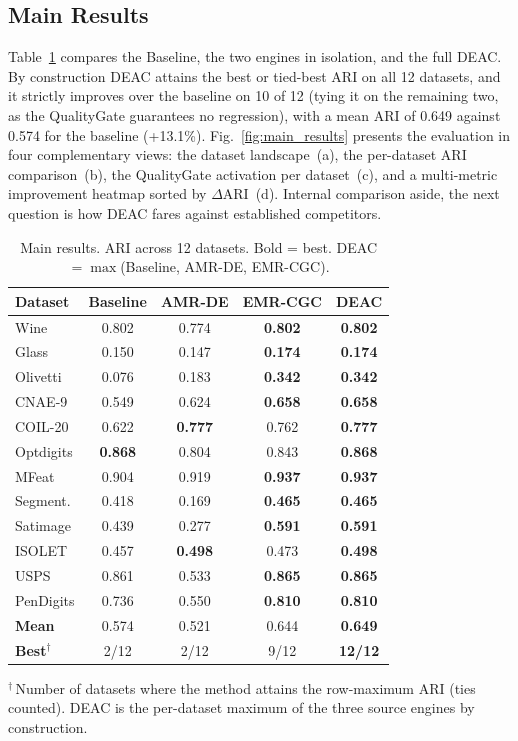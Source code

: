 \documentclass[journal]{IEEEtran}
\begin{document}
\subsection{Main Results}

Table~\ref{tab:main_results} compares the Baseline, the two engines in isolation, and the full DEAC. By construction DEAC attains the best or tied-best ARI on all 12 datasets, and it strictly improves over the baseline on 10 of 12 (tying it on the remaining two, as the QualityGate guarantees no regression), with a mean ARI of 0.649 against 0.574 for the baseline (+13.1\%). Fig.~\ref{fig:main_results} presents the evaluation in four complementary views: the dataset landscape~(a), the per-dataset ARI comparison~(b), the QualityGate activation per dataset~(c), and a multi-metric improvement heatmap sorted by $\Delta$ARI~(d). Internal comparison aside, the next question is how DEAC fares against established competitors.

\begin{table}[!t]
\centering
\caption{Main results. ARI across 12 datasets. Bold = best. DEAC $= \max$(Baseline, AMR-DE, EMR-CGC).}
\label{tab:main_results}
\footnotesize
\setlength{\tabcolsep}{4pt}
\begin{tabular}{lcccc}
\toprule
Dataset & Baseline & AMR-DE & EMR-CGC & \textbf{DEAC} \\
\midrule
Wine         & 0.802 & 0.774 & \textbf{0.802} & \textbf{0.802} \\
Glass        & 0.150 & 0.147 & \textbf{0.174} & \textbf{0.174} \\
Olivetti     & 0.076 & 0.183 & \textbf{0.342} & \textbf{0.342} \\
CNAE-9       & 0.549 & 0.624 & \textbf{0.658} & \textbf{0.658} \\
COIL-20      & 0.622 & \textbf{0.777} & 0.762 & \textbf{0.777} \\
Optdigits    & \textbf{0.868} & 0.804 & 0.843 & \textbf{0.868} \\
MFeat        & 0.904 & 0.919 & \textbf{0.937} & \textbf{0.937} \\
Segment.     & 0.418 & 0.169 & \textbf{0.465} & \textbf{0.465} \\
Satimage     & 0.439 & 0.277 & \textbf{0.591} & \textbf{0.591} \\
ISOLET       & 0.457 & \textbf{0.498} & 0.473 & \textbf{0.498} \\
USPS         & 0.861 & 0.533 & \textbf{0.865} & \textbf{0.865} \\
PenDigits    & 0.736 & 0.550 & \textbf{0.810} & \textbf{0.810} \\
\midrule
\textbf{Mean} & 0.574 & 0.521 & 0.644 & \textbf{0.649} \\
\textbf{Best$^\dagger$} & 2/12 & 2/12 & 9/12 & \textbf{12/12} \\
\bottomrule
\end{tabular}

\vspace{2pt}
{\footnotesize $^\dagger$\,Number of datasets where the method attains the row-maximum ARI (ties counted). DEAC is the per-dataset maximum of the three source engines by construction.}
\end{table}
\end{document}
